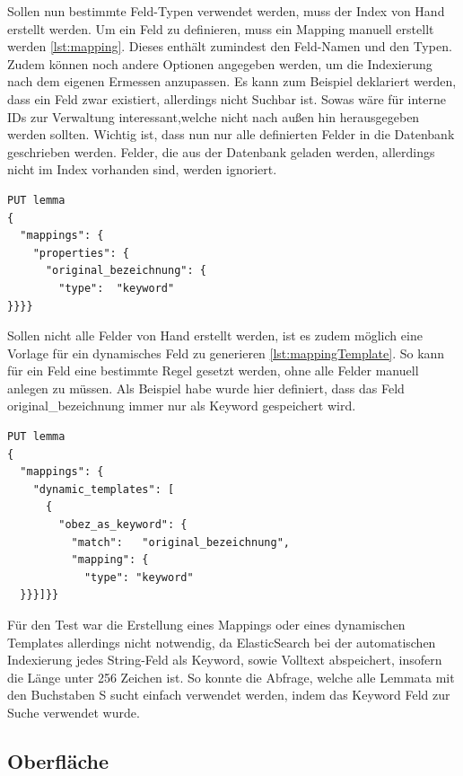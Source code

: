 Sollen nun bestimmte Feld-Typen verwendet werden, muss der Index von Hand erstellt werden. Um ein Feld zu definieren, muss ein Mapping manuell erstellt werden \ref{lst:mapping}. Dieses enthält zumindest den Feld-Namen und den Typen. Zudem können noch andere Optionen angegeben werden, um die Indexierung nach dem eigenen Ermessen anzupassen. Es kann zum Beispiel deklariert werden, dass ein Feld zwar existiert, allerdings nicht Suchbar ist. Sowas wäre für interne IDs zur Verwaltung interessant,welche nicht nach außen hin herausgegeben werden sollten. Wichtig ist, dass nun nur alle definierten Felder in die Datenbank geschrieben werden. Felder, die aus der Datenbank geladen werden, allerdings nicht im Index vorhanden sind, werden ignoriert.

\begin{lstlisting}[language=xml, frame=single, label={lst:mapping}] 
PUT lemma
{
  "mappings": {
    "properties": {
      "original_bezeichnung": {
        "type":  "keyword"
}}}}
\end{lstlisting}

Sollen nicht alle Felder von Hand erstellt werden, ist es zudem möglich eine Vorlage für ein dynamisches Feld zu generieren \ref{lst:mappingTemplate}. So kann für ein Feld eine bestimmte Regel gesetzt werden, ohne alle Felder manuell anlegen zu müssen. Als Beispiel habe wurde hier definiert, dass das Feld original\_bezeichnung immer nur als Keyword gespeichert wird.

\begin{lstlisting}[language=xml, frame=single, label={lst:mappingTemplate}] 
PUT lemma
{
  "mappings": {
    "dynamic_templates": [
      {
        "obez_as_keyword": {
          "match":   "original_bezeichnung",
          "mapping": {
            "type": "keyword"
  }}}]}}
\end{lstlisting}

Für den Test war die Erstellung eines Mappings oder eines dynamischen Templates allerdings nicht notwendig, da ElasticSearch bei der automatischen Indexierung jedes String-Feld als Keyword, sowie Volltext abspeichert, insofern die Länge unter 256 Zeichen ist. So konnte die Abfrage, welche alle Lemmata mit den Buchstaben S sucht einfach verwendet werden, indem das Keyword Feld zur Suche verwendet wurde.

\subsection{Oberfläche}

